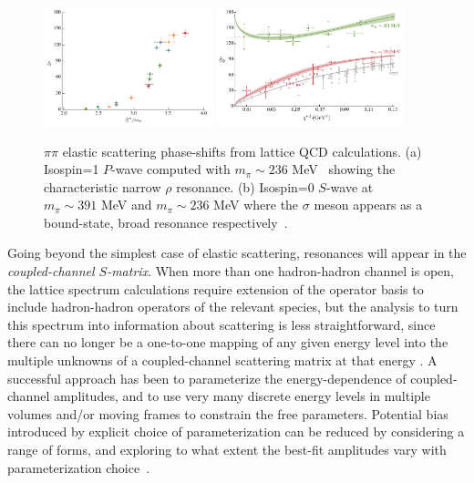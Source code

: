 \begin{figure}
\includegraphics[width=0.44\textwidth]{figures/bulava}
\includegraphics[width=0.48\textwidth]{figures/sigma}
\caption{$\pi\pi$ elastic scattering phase-shifts from lattice QCD calculations. (a) Isospin=1 $P$-wave computed with $m_\pi \sim 236$ MeV~\cite{Bulava:2016mks} showing the characteristic narrow $\rho$ resonance. (b) Isospin=0 $S$-wave at $m_\pi \sim 391$ MeV and $m_\pi \sim 236$ MeV where the $\sigma$ meson appears as a bound-state, broad resonance respectively~\cite{Briceno:2016mjc}.}
\label{elastic}
\end{figure}


Going beyond the simplest case of elastic scattering, resonances will appear in the \emph{coupled-channel $S$-matrix}. When more than one hadron-hadron channel is open, the lattice spectrum calculations require extension of the operator basis to include hadron-hadron operators of the relevant species, but the analysis to turn this spectrum into information about scattering is less straightforward, since there can no longer be a one-to-one mapping of any given energy level into the multiple unknowns of a coupled-channel scattering matrix at that energy \cite{Luscher:1986pf}. A successful approach \cite{Dudek:2014qha,Wilson:2014cna,Wilson:2015dqa,Moir:2016srx,Dudek:2016cru,Briceno:2017qmb} has been to parameterize the energy-dependence of coupled-channel amplitudes, and to use very many discrete energy levels in multiple volumes and/or moving frames to constrain the free parameters. Potential bias introduced by explicit choice of parameterization can be reduced by considering a range of forms, and exploring to what extent the best-fit amplitudes vary with parameterization choice~\cite{Dudek:2014qha,Wilson:2014cna,Wilson:2015dqa,Moir:2016srx,Dudek:2016cru,Briceno:2017qmb}. 

